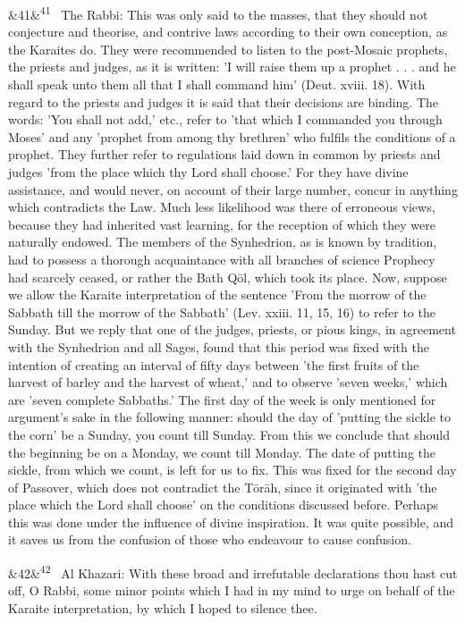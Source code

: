 \documentclass[12pt]{article}
\newcommand{\para}[1][]{\par\noindent\ifx&#1&\else\textsuperscript{\footnotesize #1}~\fi}
\begin{document}
\para[41] The Rabbi: This was only said to the masses, that they should not conjecture and theorise, and contrive laws according to their own conception, as the Karaites do. They were recommended to listen to the post-Mosaic prophets, the priests and judges, as it is written: 'I will raise them up a prophet . . . and he shall speak unto them all that I shall command him' (Deut. xviii. 18). With regard to the priests and judges it is said that their decisions are binding. The words: 'You shall not add,' etc., refer to 'that which I commanded you through Moses' and any 'prophet from among thy brethren' who fulfils the conditions of a prophet. They further refer to regulations laid down in common by priests and judges 'from the place which thy Lord shall choose.' For they have divine assistance, and would never, on account of their large number, concur in anything which contradicts the Law. Much less likelihood was there of erroneous views, because they had inherited vast learning, for the reception of which they were naturally endowed. The members of the Synhedrion, as is known by tradition, had to possess a thorough acquaintance with all branches of science Prophecy had scarcely ceased, or rather the Bath Qōl, which took its place. Now, suppose we allow the Karaite interpretation of the sentence 'From the morrow of the Sabbath till the morrow of the Sabbath' (Lev. xxiii. 11, 15, 16) to refer to the Sunday. But we reply that one of the judges, priests, or pious kings, in agreement with the Synhedrion and all Sages, found that this period was fixed with the intention of creating an interval of fifty days between 'the first fruits of the harvest of barley and the harvest of wheat,' and to observe 'seven weeks,' which are 'seven complete Sabbaths.' The first day of the week is only mentioned for argument's sake in the following manner: should the day of 'putting the sickle to the corn' be a Sunday, you count till Sunday. From this we conclude that should the beginning be on a Monday, we count till Monday. The date of putting the sickle, from which we count, is left for us to fix. This was fixed for the second day of Passover, which does not contradict the Tōrāh, since it originated with 'the place which the Lord shall choose' on the conditions discussed before. Perhaps this was done under the influence of divine inspiration. It was quite possible, and it saves us from the confusion of those who endeavour to cause confusion.

\para[42] Al Khazari: With these broad and irrefutable declarations thou hast cut off, O Rabbi, some minor points which I had in my mind to urge on behalf of the Karaite interpretation, by which I hoped to silence thee.
\end{document}
